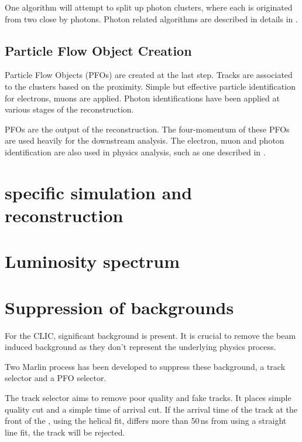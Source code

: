 One algorithm will attempt to split up photon clusters, where each is originated from two close by photons. Photon related algorithms are described in details in .



\subsection{Particle Flow Object Creation}
\label{sec:pandoraPFOcreation}

Particle Flow Objects (PFOs) are created at the last step. Tracks are associated to the clusters based on the proximity. Simple but effective particle identification for electrons, muons are applied. Photon identifications have been applied at various stages of the reconstruction.

PFOs are the output of the \pandora reconstruction. The four-momentum of these PFOs are  used heavily for the downstream analysis. The electron, muon and photon identification are  also used in physics analysis, such as one described in .

\section{\CLIC specific simulation and reconstruction}

\section{Luminosity spectrum}



\section{Suppression of \ggHad backgrounds}
\label{sec:pandoraggHad}


For the CLIC, significant \ggHad background is present. It is crucial to remove the beam induced background as they don't represent the underlying physics process.

Two Marlin process has been developed to suppress these background, a track selector and a PFO selector\cite{Marshall:2012ry}.

The track selector aims to remove poor quality and fake tracks. It places simple quality cut and a simple time of arrival cut. If the arrival time of the track at the front of the \ECAL, using the helical fit, differs more than 50\,ns from using a straight line fit, the track will be rejected.

